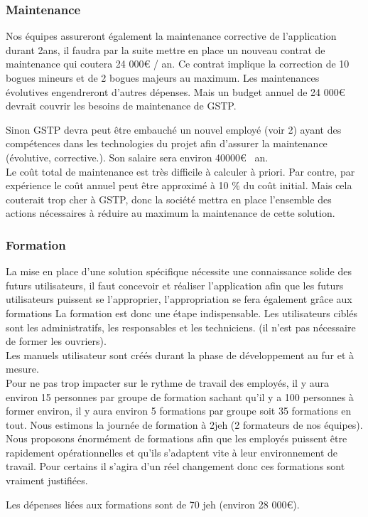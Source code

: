 \begin{enumerate}
    \subsubsection{Maintenance}

    Nos équipes assureront également la maintenance corrective de l'application durant 2ans, il faudra par la suite mettre en place un nouveau contrat de maintenance qui coutera 24 000€ / an. Ce contrat implique la correction de 10 bogues mineurs et de 2 bogues majeurs au maximum. Les maintenances évolutives engendreront d'autres dépenses. Mais un budget annuel de 24 000€ devrait couvrir les besoins de maintenance de GSTP.

    Sinon GSTP devra peut être embauché un nouvel employé (voir 2) ayant des compétences dans les technologies du projet afin d'assurer la maintenance (évolutive, corrective.). Son salaire sera environ 40000€ \ an.\\

    Le coût total de maintenance est très difficile à calculer à priori. 
    Par contre, par expérience le coût annuel peut être approximé à  10 \% du coût initial. Mais cela couterait trop cher à GSTP, donc la société mettra
    en place l'ensemble des actions nécessaires à réduire au maximum la maintenance de cette solution.

    \subsubsection{Formation}
        La mise en place d'une solution spécifique nécessite une connaissance solide des futurs utilisateurs, il faut concevoir et réaliser l'application afin que les futurs utilisateurs puissent se l'approprier, l'appropriation se fera également grâce aux formations
          La formation est donc une étape indispensable. Les utilisateurs ciblés sont les administratifs, les responsables et les techniciens. (il n'est pas nécessaire de former les ouvriers).\\

    Les manuels utilisateur sont créés durant la phase de développement au fur et à mesure.\\

    Pour ne pas trop impacter sur le rythme de travail des employés, il y aura environ 15 personnes par groupe de formation sachant qu'il y a 100 personnes à former  environ, il y aura environ 5 formations par groupe soit 35 formations en tout.
    Nous estimons la journée de formation à 2jeh (2 formateurs de nos équipes). Nous proposons énormément de formations afin que les employés puissent être rapidement opérationnelles et qu'ils s'adaptent vite à leur environnement de travail. Pour certains il s'agira d'un réel changement donc ces formations sont vraiment justifiées.

    Les dépenses liées aux formations sont de 70 jeh (environ 28 000€).
     

    \end{enumerate}


